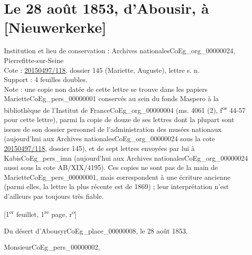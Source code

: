 \documentclass{book}
\begin{document}
\section*{Le 28 août 1853, d'Abousir, à [Nieuwerkerke]} \label{CoEg_Mariette_1853-08-28} 
{\footnotesize \noindent Institution et lieu de conservation : Archives nationales\gls{CoEg_org_00000024}, Pierrefitte-sur-Seine\\
Cote : \hyperref[CoEg_Mariette_ms_001]{20150497/118}, dossier 145 (Mariette, Auguste), lettre s. n.\\
Support : 4 feuilles doubles.\\
Note : une copie non datée de cette lettre se trouve dans les papiers Mariette\gls{CoEg_pers_00000001} conservés au sein du fonds Maspero à la bibliothèque de l'Institut de France\gls{CoEg_org_00000004} (ms. 4061 (2), f\textsuperscript{os} 44-57 pour cette lettre), parmi la copie de douze de ses lettres dont la plupart sont issues de son dossier personnel de l'administration des musées nationaux (aujourd'hui aux Archives nationales\gls{CoEg_org_00000024} sous la cote \hyperref[CoEg_Mariette_ms_001]{20150497/118}, dossier 145), et de sept lettres envoyées par lui à Kabis\gls{CoEg_pers_imn} (aujourd'hui aux Archives nationales\gls{CoEg_org_00000024} aussi sous la cote AB/XIX/4195). Ces copies ne sont pas de la main de Mariette\gls{CoEg_pers_00000001}, mais correspondent à une écriture ancienne (parmi elles, la lettre la plus récente est de 1869) ; leur interprétation n'est d'ailleurs pas toujours très fiable.
\begin{center} {[1\textsuperscript{er} feuillet, 1\textsuperscript{re} page, r\textsuperscript{o}]}\end{center}}
\begin{flushright}Du désert d’Abousyr\gls{CoEg_place_00000008}, le 28 août 1853.\end{flushright}

\hspace{1cm} Monsieur\gls{CoEg_pers_00000002},\\
\end{document}
